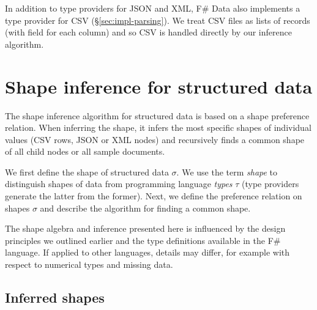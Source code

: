 \documentclass[10pt]{sigplanconf}
\begin{document}
In addition to type providers for JSON and XML, F\# Data also implements a type provider for CSV 
(\S\ref{sec:impl-parsing}). We treat CSV files as lists of records (with field for each column) 
and so CSV is handled directly by our inference algorithm.

%
%

\section{Shape inference for structured data}
\label{sec:inference}

The shape inference algorithm for structured data is based on a shape preference relation. When 
inferring the shape, it infers the most specific shapes of individual values (CSV rows, JSON or XML 
nodes) and recursively finds a common shape of all child nodes or all sample documents.

We first define the shape of structured data $\sigma$. We use the term \emph{shape} to distinguish 
shapes of data from programming language \emph{types} $\tau$ (type providers generate the latter from the former). 
Next, we define the preference relation on shapes $\sigma$ and describe the algorithm 
for finding a common shape. 

The shape algebra and inference presented here is influenced by the design principles
we outlined earlier and the type definitions available in the F\# language.
If applied to other languages, details may differ, for example
with respect to numerical types and missing data.


\subsection{Inferred shapes}
\label{sec:inference-types}
\end{document}

